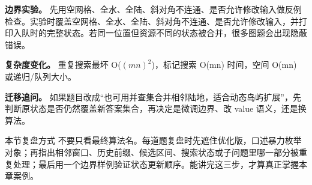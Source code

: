\textbf{边界实验。} 先用空网格、全水、全陆、斜对角不连通、是否允许修改输入做反例检查。实验时覆盖空网格、全水、全陆、斜对角不连通、是否允许修改输入，并打印入队时的完整状态。若同一位置但资源不同的状态被合并，很多图题会出现隐蔽错误。

\textbf{复杂度变化。} 重复搜索最坏 O(\ensuremath{(mn)^{2}})，标记搜索 O(mn) 时间，空间 O(mn) 或递归/队列大小。

\textbf{迁移追问。} 如果题目改成“也可用并查集合并相邻陆地，适合动态岛屿扩展”，先判断原状态是否仍然覆盖新答案集合，再决定是微调边界、改 value 语义，还是换算法。

\begin{principlebox}{本节复盘方式}
不要只看最终算法名。每道题复盘时先遮住优化版，口述暴力枚举对象；再指出相邻窗口、历史前缀、候选区间、搜索状态或子问题里哪一部分被重复处理；最后用一个边界样例验证状态更新顺序。能讲完这三步，才算真正掌握本章案例。
\end{principlebox}
